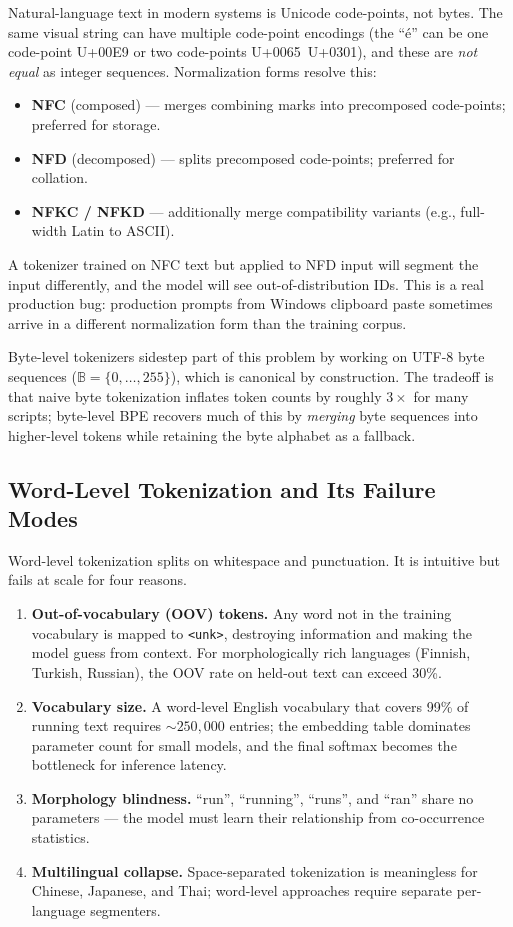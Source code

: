 Natural-language text in modern systems is Unicode code-points, not
bytes. The same visual string can have multiple code-point encodings
(the ``\'e'' can be one code-point U+00E9 or two code-points
U+0065~U+0301), and these are \emph{not equal} as integer sequences.
Normalization forms resolve this:
\begin{itemize}
  \item \textbf{NFC} (composed) — merges combining marks into
        precomposed code-points; preferred for storage.
  \item \textbf{NFD} (decomposed) — splits precomposed code-points;
        preferred for collation.
  \item \textbf{NFKC / NFKD} — additionally merge compatibility
        variants (e.g., full-width Latin to ASCII).
\end{itemize}
A tokenizer trained on NFC text but applied to NFD input will segment
the input differently, and the model will see out-of-distribution IDs.
This is a real production bug: production prompts from Windows clipboard
paste sometimes arrive in a different normalization form than the
training corpus.

Byte-level tokenizers sidestep part of this problem by working on UTF-8
byte sequences ($\mathbb{B} = \{0, \ldots, 255\}$), which is canonical
by construction. The tradeoff is that naive byte tokenization inflates
token counts by roughly $3\times$ for many scripts; byte-level BPE
recovers much of this by \emph{merging} byte sequences into higher-level
tokens while retaining the byte alphabet as a fallback.

\subsection{Word-Level Tokenization and Its Failure Modes}

Word-level tokenization splits on whitespace and punctuation. It is
intuitive but fails at scale for four reasons.

\begin{enumerate}
  \item \textbf{Out-of-vocabulary (OOV) tokens.} Any word not in the
        training vocabulary is mapped to \texttt{<unk>}, destroying
        information and making the model guess from context. For
        morphologically rich languages (Finnish, Turkish, Russian),
        the OOV rate on held-out text can exceed 30\%.
  \item \textbf{Vocabulary size.} A word-level English vocabulary that
        covers 99\% of running text requires $\sim\!250{,}000$
        entries; the embedding table dominates parameter count for
        small models, and the final softmax becomes the bottleneck
        for inference latency.
  \item \textbf{Morphology blindness.} ``run'', ``running'', ``runs'',
        and ``ran'' share no parameters — the model must learn their
        relationship from co-occurrence statistics.
  \item \textbf{Multilingual collapse.} Space-separated tokenization is
        meaningless for Chinese, Japanese, and Thai; word-level
        approaches require separate per-language segmenters.
\end{enumerate}

